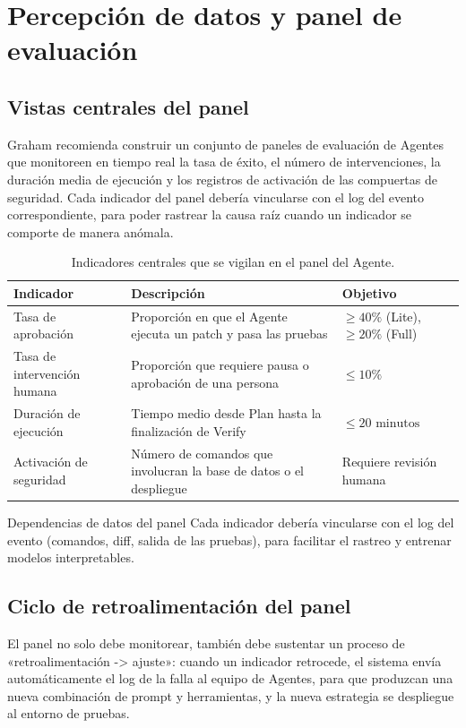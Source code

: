 \section{Percepción de datos y panel de evaluación}
\subsection{Vistas centrales del panel}
Graham recomienda construir un conjunto de paneles de evaluación de Agentes que monitoreen en tiempo real la tasa de éxito, el número de intervenciones, la duración media de ejecución y los registros de activación de las compuertas de seguridad. Cada indicador del panel debería vincularse con el log del evento correspondiente, para poder rastrear la causa raíz cuando un indicador se comporte de manera anómala.

\begin{table}[H]
\centering
\begin{tabular}{p{} p{} p{}}
\toprule
Indicador & Descripción & Objetivo \\
\midrule
Tasa de aprobación & Proporción en que el Agente ejecuta un patch y pasa las pruebas & \(\geq 40\%\) (Lite), \(\geq 20\%\) (Full) \\
\midrule
Tasa de intervención humana & Proporción que requiere pausa o aprobación de una persona & \(\leq 10\%\) \\
\midrule
Duración de ejecución & Tiempo medio desde Plan hasta la finalización de Verify & \(\leq 20 \text{ minutos}\) \\
\midrule
Activación de seguridad & Número de comandos que involucran la base de datos o el despliegue & Requiere revisión humana \\
\bottomrule
\end{tabular}
\caption{Indicadores centrales que se vigilan en el panel del Agente.}
\end{table}

\begin{knowledgebox}{Dependencias de datos del panel}
Cada indicador debería vincularse con el log del evento (comandos, diff, salida de las pruebas), para facilitar el rastreo y entrenar modelos interpretables.
\end{knowledgebox}

\subsection{Ciclo de retroalimentación del panel}
El panel no solo debe monitorear, también debe sustentar un proceso de «retroalimentación -> ajuste»: cuando un indicador retrocede, el sistema envía automáticamente el log de la falla al equipo de Agentes, para que produzcan una nueva combinación de prompt y herramientas, y la nueva estrategia se despliegue al entorno de pruebas.


